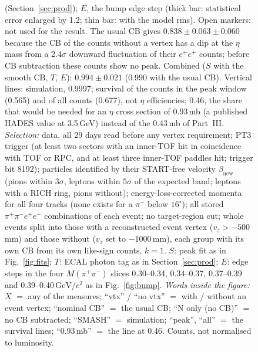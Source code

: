 \documentclass[11pt,a4paper]{article}
\newcommand{\pim}{\ensuremath{\pi^{-}}\xspace}
\newcommand{\ppee}{\ensuremath{\pi^{+}\pi^{-}e^{+}e^{-}}\xspace}
\newcommand{\Mpipi}{\ensuremath{M(\pi^{+}\pi^{-})}\xspace}
\newcommand{\betanew}{\ensuremath{\beta_{\mathrm{new}}}\xspace}
\newcommand{\GeVcc}{\ensuremath{\mathrm{GeV}/c^{2}}\xspace}
\newcommand{\vz}{\ensuremath{v_z}\xspace}
\newcommand{\selptthree}{PT3 trigger (at least two sectors with an inner-TOF hit in coincidence with TOF or RPC, and at least three
inner-TOF paddles hit; trigger bit 8192)\xspace}
\newcommand{\selpid}{particles identified by their START-free velocity \betanew (pions within $3\sigma$, leptons within $5\sigma$ of the
expected band; leptons with a RICH ring, pions without)\xspace}
\newcommand{\selcor}{energy-loss-corrected momenta for all four tracks (none exists for a \pim below $16^\circ$)\xspace}
\newcommand{\selall}{all stored \ppee combinations of each event\xspace}
\begin{document}
\begin{figure}[tbp]
\begin{minipage}[t]{0.485\textwidth}
{(Section~\ref{sec:prod}); $E$, the bump edge step (thick bar: statistical error enlarged by 1.2; thin bar: with the model rms). Open
markers: not used for the result. The usual CB gives $0.838\pm0.063\pm0.060$ because the CB of the counts without a vertex has a dip at
the $\eta$ mass from a 2.4$\sigma$ downward fluctuation of their $e^+e^+$ counts; before CB subtraction these counts show no peak.
Combined ($S$ with the smooth CB, $T$, $E$): $0.994\pm0.021$ (0.990 with the usual CB). Vertical lines: simulation, 0.9997; survival of
the counts in the peak window (0.565) and of all counts (0.677), not $\eta$ efficiencies; 0.46, the share that would be needed for an
$\eta$ cross section of 0.93\,mb (a published HADES value at 3.5\,GeV) instead of the 0.43\,mb of Part~III.
\emph{Selection:} data, all 29 days read before any vertex requirement; \selptthree; \selpid; \selcor; \selall; no target-region cut;
whole events split into those with a reconstructed event vertex ($\vz>-500$\,mm) and those without (\vz set to $-1000$\,mm), each group
with its own CB from its own like-sign counts, $k=1$. $S$: peak fit as in Fig.~\ref{fig:fits}; $T$: ECAL photon tag as in
Section~\ref{sec:prod}; $E$: edge steps in the four \Mpipi slices 0.30--0.34, 0.34--0.37, 0.37--0.39 and 0.39--0.40\,\GeVcc as in
Fig.~\ref{fig:bump}.
\emph{Words inside the figure:} $X$ $=$ any of the measures; ``vtx'' / ``no vtx'' $=$ with / without an event vertex; ``nominal CB''
$=$ the usual CB; ``N only (no CB)'' $=$ no CB subtracted; ``SMASH'' $=$ simulation; ``peak'', ``all'' $=$ the survival lines;
``0.93\,mb'' $=$ the line at 0.46. Counts, not normalised to luminosity.}
\label{fig:res-vertex}
\end{minipage}
\end{figure}

\end{document}
